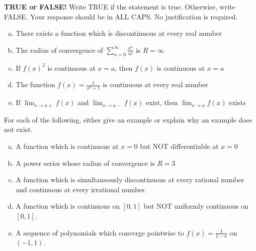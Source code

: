 \documentclass[11pt]{exam}
\theoremstyle{definition}
\begin{document}
\begin{questions}

\addpoints

\question[10]\mbox{}
\textbf{TRUE or FALSE!}  Write  TRUE if the statement is true.  Otherwise, write FALSE.  Your response should be in ALL CAPS.  No justification is required.
\begin{enumerate}[(a)]
\item  
There exists a function which is discontinuous at every real number
\vspace{1.3in}
\item
The radius of convergence of $\sum_{n=0}^\infty \frac{x^n}{n!}$ is $R=\infty$
\vspace{1.3in}
\item
If $f(x)^2$ is continuous at $x=a$, then $f(x)$ is continuous at $x=a$
\vspace{1.3in}
\item
The function $f(x) = \frac{1}{x^2+1}$ is continuous at every real number
\vspace{1.3in}
\item  
If $\lim_{x\rightarrow a+} f(x)$ and $\lim_{x\rightarrow a-}f(x)$ exist, then $\lim_{x\rightarrow a}f(x)$ exists
\vspace{1.3in}
\end{enumerate}

\newpage
\question[10]\mbox{}

For each of the following, either give an example or explain why an example does not exist.

\begin{enumerate}[(a)]
\item  
A function which is continuous at $x=0$ but NOT differentiable at $x=0$
\vspace{1.3in}
\item
A power series whose radius of convergence is $R=3$
\vspace{1.3in}
\item
A function which is simultaneously discontinuous at every rational number and continuous at every irrational number.
\vspace{1.3in}
\item
A function which is continuous on $[0,1]$ but NOT uniformly continuous on $[0,1]$.
\vspace{1.3in}
\item  
A sequence of polynomials which converge pointwise to $f(x) = \frac{1}{1-x}$ on $(-1,1)$.
\vspace{1.3in}
\end{enumerate}


\end{questions}
\end{document}
